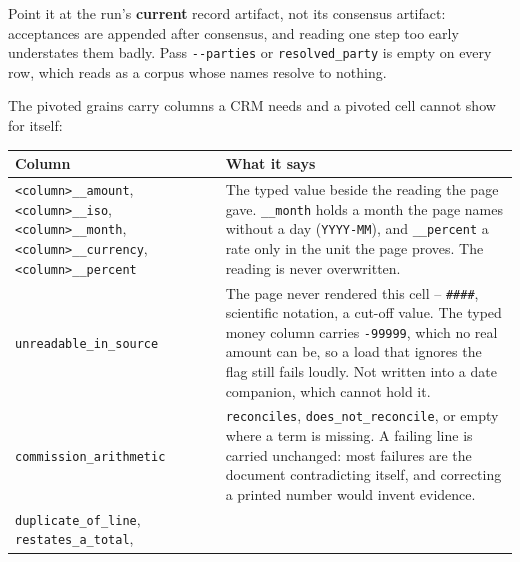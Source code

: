 \documentclass[
]{article}
\newcounter{none} %
\begin{document}
Point it at the run's \textbf{current} record artifact, not its
consensus artifact: acceptances are appended after consensus, and
reading one step too early understates them badly. Pass
\texttt{-\/-parties} or \texttt{resolved\_\allowbreak{}party} is empty
on every row, which reads as a corpus whose names resolve to nothing.

The pivoted grains carry columns a CRM needs and a pivoted cell cannot
show for itself:

{\def\LTcaptype{none} %
\begin{longtable}[]{@{}
  >{\raggedright\arraybackslash}p{}
  >{\raggedright\arraybackslash}p{}@{}}
\toprule\noalign{}
\begin{minipage}[b]{\linewidth}\raggedright
Column
\end{minipage} & \begin{minipage}[b]{\linewidth}\raggedright
What it says
\end{minipage} \\
\midrule\noalign{}
\endhead
\bottomrule\noalign{}
\endlastfoot
\texttt{<column>\_\allowbreak{}\_\allowbreak{}amount},
\texttt{<column>\_\allowbreak{}\_\allowbreak{}iso},
\texttt{<column>\_\allowbreak{}\_\allowbreak{}month},
\texttt{<column>\_\allowbreak{}\_\allowbreak{}currency},
\texttt{<column>\_\allowbreak{}\_\allowbreak{}percent} & The typed value
beside the reading the page gave.
\texttt{\_\allowbreak{}\_\allowbreak{}month} holds a month the page
names without a day (\texttt{YYYY-MM}), and
\texttt{\_\allowbreak{}\_\allowbreak{}percent} a rate only in the unit
the page proves. The reading is never overwritten. \\
\texttt{unreadable\_\allowbreak{}in\_\allowbreak{}source} & The page
never rendered this cell -- \texttt{\#\#\#\#}, scientific notation, a
cut-off value. The typed money column carries \texttt{-99999}, which no
real amount can be, so a load that ignores the flag still fails loudly.
Not written into a date companion, which cannot hold it. \\
\texttt{commission\_\allowbreak{}arithmetic} & \texttt{reconciles},
\texttt{does\_\allowbreak{}not\_\allowbreak{}reconcile}, or empty where
a term is missing. A failing line is carried unchanged: most failures
are the document contradicting itself, and correcting a printed number
would invent evidence. \\
\texttt{duplicate\_\allowbreak{}of\_\allowbreak{}line},
\texttt{restates\_\allowbreak{}a\_\allowbreak{}total},

\end{longtable}}
\end{document}
